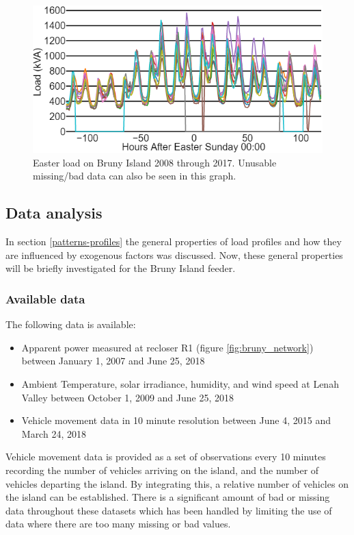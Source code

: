 \begin{figure}[htbp]
	\centerline{\includegraphics[width=.65\textwidth]{images/easter_bruny.png}}
	\caption{Easter load on Bruny Island 2008 through 2017.
		Unusable missing/bad data can also be seen in this graph.}
	\label{fig:bruny_easter}
\end{figure}

\subsection{Data analysis}
\label{bruny-data-analysis}

In section \ref{patterns-profiles} the general properties of load profiles and how they are influenced by exogenous factors was discussed. Now, these general properties will be briefly investigated for the Bruny Island feeder.
\subsubsection{Available data}
The following data is available:
\begin{itemize}
	\item Apparent power measured at recloser R1 (figure \ref{fig:bruny_network}) between January 1, 2007 and June 25, 2018
	\item Ambient Temperature, solar irradiance, humidity, and wind speed at Lenah Valley between October 1, 2009 and June 25, 2018
	\item Vehicle movement data in 10 minute resolution between June 4, 2015 and March 24, 2018
\end{itemize}	
Vehicle movement data is provided as a set of observations every 10 minutes recording the number of vehicles arriving on the island, and the number of vehicles departing the island.
By integrating this, a relative number of vehicles on the island can be established.
There is a significant amount of bad or missing data throughout these datasets which has been handled by limiting the use of data where there are too many missing or bad values.


